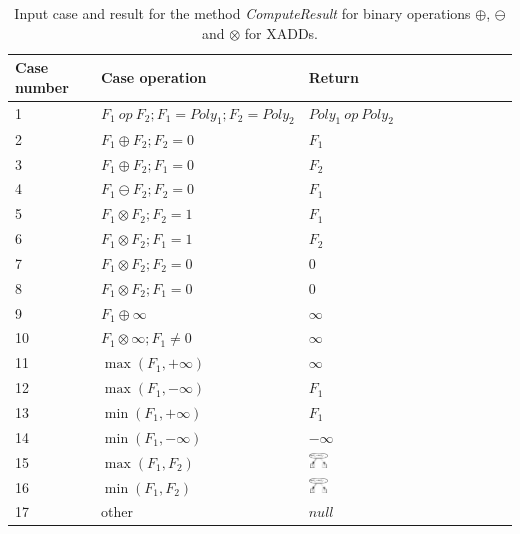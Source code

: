 \documentclass[twoside,11pt]{article}
\begin{document}
\begin{table}[!h]
\begin{center}
    \begin{tabular}{|l|l|l|}
	 \hline
	 Case number&Case operation & Return \\ \hline \hline
1&         $F_1\ \mathit{op}\ F_2; F_1=\mathit{Poly}_1; F_2=\mathit{Poly}_2$ & $\mathit{Poly}_1\ \mathit{op}\ \mathit{Poly}_2$ \\
	 \hline
2&          $F_1  \oplus F_2; F_2=0$ & $F_1$\\
	 \hline
3&          $F_1  \oplus F_2; F_1=0$ & $F_2$\\
	 \hline
4&         $F_1  \ominus F_2; F_2=0$ & $F_1$\\
	 \hline
5&         $F_1  \otimes F_2; F_2=1$ & $F_1$\\
	 \hline
6&          $F_1  \otimes F_2; F_1=1$ & $F_2$\\
	 \hline
7&         $F_1  \otimes F_2; F_2=0$ & 0\\
	 \hline
8&          $F_1  \otimes F_2; F_1=0$ &0\\
	 \hline
9&          $F_1  \oplus \infty $ & $\infty$\\
	 \hline
10&          $F_1  \otimes \infty ; F_1 \neq 0$ & $\infty$\\
	 \hline
11&          $\max (F_1  , +\infty)$ & $\infty$\\
	 \hline
12&          $\max (F_1, -\infty)$ & $F_1$\\
	 \hline
13&          $\min (F_1  , +\infty)$ & $F_1$\\
	 \hline
14&          $\min (F_1, -\infty)$ & $-\infty$\\
	 \hline
15&          $\max (F_1  , F_2)$ &\hspace{3mm} \includegraphics[width=0.1\textwidth]{pics/max_result.pdf}\\
	 \hline
16&          $\min (F_1, F_2)$ &\hspace{3mm}  \includegraphics[width=0.1\textwidth]{pics/min_result.pdf}\\
	 \hline
17&	  other& $\mathit{null}$\\
         \hline
    \end{tabular}
  \caption{Input case and result for the method \emph{ComputeResult}
  for binary operations  $\oplus$,  $\ominus$ and $\otimes$ for XADDs.
  }
  \label{tab:ComputeResultXADD}
\end{center}
\end{table}
\end{document}
